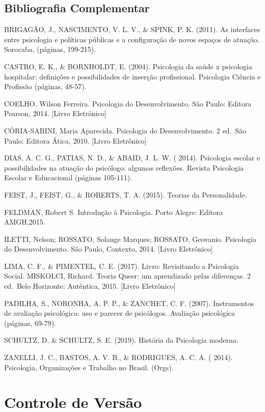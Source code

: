 \documentclass[
]{book}
\begin{document}
\hypertarget{bibliografia-complementar}{%
\subsection{Bibliografia Complementar}\label{bibliografia-complementar}}

BRIGAGÃO, J., NASCIMENTO, V. L. V., \& SPINK, P. K. (2011). As interfaces entre psicologia e políticas públicas e a configuração de novos espaços de atuação. Sorocaba, (páginas, 199-215).

CASTRO, E. K., \& BORNHOLDT, E. (2004). Psicologia da saúde x psicologia hospitalar: definições e possibilidades de inserção profissional. Psicologia Ciência e Profissão (páginas, 48-57).

COELHO, Wilson Ferreira. Psicologia do Desenvolvimento. São Paulo: Editora Pearson, 2014. {[}Livro Eletrônico{]}

CÓRIA-SABINI, Maria Aparecida. Psicologia do Desenvolvimento. 2 ed.~São Paulo: Editora Ática, 2010. {[}Livro Eletrônico{]}

DIAS, A. C. G., PATIAS, N. D., \& ABAID, J. L. W. ( 2014). Psicologia escolar e possibilidades na atuação do psicólogo: algumas reflexões. Revista Psicologia Escolar e Educacional (páginas 105-111).

FEIST, J., FEIST, G., \& ROBERTS, T. A. (2015). Teorias da Personalidade.

FELDMAN, Robert S. Introdução à Psicologia. Porto Alegre: Editora AMGH,2015.

ILETTI, Nelson; ROSSATO, Solange Marques; ROSSATO, Geovanio. Psicologia do Desenvolvimento. São Paulo, Contexto, 2014. {[}Livro Eletrônico{]}

LIMA, C. F., \& PIMENTEL, C. E. (2017). Livro: Revisitando a Psicologia Social. MISKOLCI, Richard. Teoria Queer: um aprendizado pelas diferenças. 2 ed.~Belo Horizonte: Autêntica, 2015. {[}Livro Eletrônico{]}

PADILHA, S., NORONHA, A. P. P., \& ZANCHET, C. F. (2007). Instrumentos de avaliação psicológica: uso e parecer de psicólogos. Avaliação psicológica (páginas, 69-79).

SCHULTZ, D. \& SCHULTZ, S. E. (2019). História da Psicologia moderna.

ZANELLI, J. C., BASTOS, A. V. B., \& RODRIGUES, A. C. A. ( 2014). Psicologia, Organizações e Trabalho no Brasil. (Orgs).

\hypertarget{controle-de-versuxe3o}{%
\section{Controle de Versão}\label{controle-de-versuxe3o}}
\end{document}
